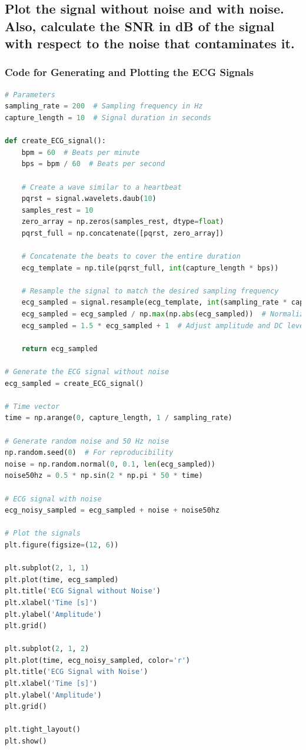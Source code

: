 \documentclass[10pt]{article}
\theoremstyle{definition}
\theoremstyle{remark}
\theoremstyle{definition}
\numberwithin{equation}{prob}
\begin{document}
\subsection{Plot the signal without noise and with noise. Also, calculate the SNR in dB of the signal with respect to the noise that contaminates it.}

\subsubsection*{Code for Generating and Plotting the ECG Signals}

\begin{lstlisting}[language=Python]
# Parameters
sampling_rate = 200  # Sampling frequency in Hz
capture_length = 10  # Signal duration in seconds

def create_ECG_signal():
    bpm = 60  # Beats per minute
    bps = bpm / 60  # Beats per second

    # Create a wave similar to a heartbeat
    pqrst = signal.wavelets.daub(10)
    samples_rest = 10
    zero_array = np.zeros(samples_rest, dtype=float)
    pqrst_full = np.concatenate([pqrst, zero_array])

    # Concatenate the beats to cover the entire duration
    ecg_template = np.tile(pqrst_full, int(capture_length * bps))

    # Resample the signal to match the desired sampling frequency
    ecg_sampled = signal.resample(ecg_template, int(sampling_rate * capture_length))
    ecg_sampled = ecg_sampled / np.max(np.abs(ecg_sampled))  # Normalize
    ecg_sampled = 1.5 * ecg_sampled + 1  # Adjust amplitude and DC level

    return ecg_sampled

# Generate the ECG signal without noise
ecg_sampled = create_ECG_signal()

# Time vector
time = np.arange(0, capture_length, 1 / sampling_rate)

# Generate random noise and 50 Hz noise
np.random.seed(0)  # For reproducibility
noise = np.random.normal(0, 0.1, len(ecg_sampled))
noise50hz = 0.5 * np.sin(2 * np.pi * 50 * time)

# ECG signal with noise
ecg_noisy_sampled = ecg_sampled + noise + noise50hz

# Plot the signals
plt.figure(figsize=(12, 6))

plt.subplot(2, 1, 1)
plt.plot(time, ecg_sampled)
plt.title('ECG Signal without Noise')
plt.xlabel('Time [s]')
plt.ylabel('Amplitude')
plt.grid()

plt.subplot(2, 1, 2)
plt.plot(time, ecg_noisy_sampled, color='r')
plt.title('ECG Signal with Noise')
plt.xlabel('Time [s]')
plt.ylabel('Amplitude')
plt.grid()

plt.tight_layout()
plt.show()
\end{lstlisting}
\end{document}
